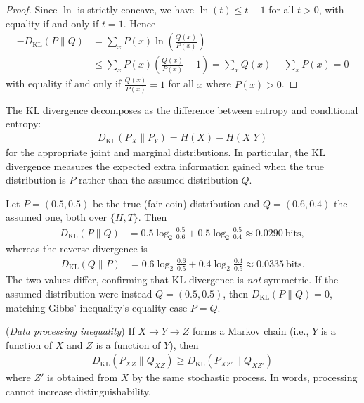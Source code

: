 \documentclass[a4paper, 12pt]{book} %
\begin{document}
\begin{proof}
    Since $\ln$ is strictly concave, we have $\ln(t) \leq t - 1$ for all $t > 0$, with equality if and only if $t = 1$. Hence
    \begin{align}
        -D_{\mathrm{KL}}(P \| Q) &= \sum_{x} P(x) \ln\left( \frac{Q(x)}{P(x)} \right) \\
        &\leq \sum_{x} P(x) \left( \frac{Q(x)}{P(x)} - 1 \right) = \sum_{x} Q(x) - \sum_{x} P(x) = 0
    \end{align}
    with equality if and only if $\frac{Q(x)}{P(x)} = 1$ for all $x$ where $P(x) > 0$.
\end{proof}

\begin{proposition}
    The KL divergence decomposes as the difference between entropy and conditional entropy:
    \begin{align}
        D_{\mathrm{KL}}(P_X \| P_Y) = H(X) - H(X|Y)
    \end{align}
    for the appropriate joint and marginal distributions. In particular, the KL divergence measures the expected extra information gained when the true distribution is $P$ rather than the assumed distribution $Q$.
\end{proposition}

\begin{example}
    Let $P = (0.5, 0.5)$ be the true (fair-coin) distribution and $Q = (0.6, 0.4)$ the assumed one, both over $\{H, T\}$. Then
    \begin{align}
        D_{\mathrm{KL}}(P \| Q) &= 0.5 \log_2\frac{0.5}{0.6} + 0.5 \log_2\frac{0.5}{0.4} \approx 0.0290 \ \text{bits},
    \end{align}
    whereas the reverse divergence is
    \begin{align}
        D_{\mathrm{KL}}(Q \| P) &= 0.6 \log_2\frac{0.6}{0.5} + 0.4 \log_2\frac{0.4}{0.5} \approx 0.0335 \ \text{bits}.
    \end{align}
    The two values differ, confirming that KL divergence is \emph{not} symmetric. If the assumed distribution were instead $Q = (0.5, 0.5)$, then $D_{\mathrm{KL}}(P\|Q) = 0$, matching Gibbs' inequality's equality case $P = Q$.
\end{example}

\begin{proposition}
    (\emph{Data processing inequality}) If $X \to Y \to Z$ forms a Markov chain (i.e., $Y$ is a function of $X$ and $Z$ is a function of $Y$), then
    \begin{align}
        D_{\mathrm{KL}}(P_{XZ} \| Q_{XZ}) \geq D_{\mathrm{KL}}(P_{XZ'} \| Q_{XZ'})
    \end{align}
    where $Z'$ is obtained from $X$ by the same stochastic process. In words, processing cannot increase distinguishability.
\end{proposition}
\end{document}
